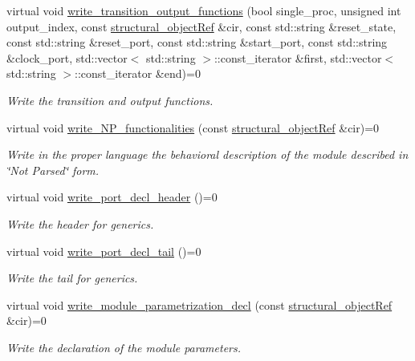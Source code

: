 \begin{DoxyCompactItemize}
virtual void \hyperlink{classlanguage__writer_a1eb41e600406aea66d35f6da5ef16098}{write\+\_\+transition\+\_\+output\+\_\+functions} (bool single\+\_\+proc, unsigned int output\+\_\+index, const \hyperlink{structural__objects_8hpp_a8ea5f8cc50ab8f4c31e2751074ff60b2}{structural\+\_\+object\+Ref} \&cir, const std\+::string \&reset\+\_\+state, const std\+::string \&reset\+\_\+port, const std\+::string \&start\+\_\+port, const std\+::string \&clock\+\_\+port, std\+::vector$<$ std\+::string $>$\+::const\+\_\+iterator \&first, std\+::vector$<$ std\+::string $>$\+::const\+\_\+iterator \&end)=0
\begin{DoxyCompactList}\small\item\em Write the transition and output functions. \end{DoxyCompactList}\item 
virtual void \hyperlink{classlanguage__writer_a75a800dc2e7afbecf76f1acaae82b6ce}{write\+\_\+\+N\+P\+\_\+functionalities} (const \hyperlink{structural__objects_8hpp_a8ea5f8cc50ab8f4c31e2751074ff60b2}{structural\+\_\+object\+Ref} \&cir)=0
\begin{DoxyCompactList}\small\item\em Write in the proper language the behavioral description of the module described in \char`\"{}\+Not Parsed\char`\"{} form. \end{DoxyCompactList}\item 
virtual void \hyperlink{classlanguage__writer_a89c790a77df81030bd359a1adcaae433}{write\+\_\+port\+\_\+decl\+\_\+header} ()=0
\begin{DoxyCompactList}\small\item\em Write the header for generics. \end{DoxyCompactList}\item 
virtual void \hyperlink{classlanguage__writer_af20577675f401b5e75b4f0a64484529b}{write\+\_\+port\+\_\+decl\+\_\+tail} ()=0
\begin{DoxyCompactList}\small\item\em Write the tail for generics. \end{DoxyCompactList}\item 
virtual void \hyperlink{classlanguage__writer_ad14ee8909894bca0a7d8874554d91d9b}{write\+\_\+module\+\_\+parametrization\+\_\+decl} (const \hyperlink{structural__objects_8hpp_a8ea5f8cc50ab8f4c31e2751074ff60b2}{structural\+\_\+object\+Ref} \&cir)=0
\begin{DoxyCompactList}\small\item\em Write the declaration of the module parameters. \end{DoxyCompactList}\item 

\end{DoxyCompactItemize}
